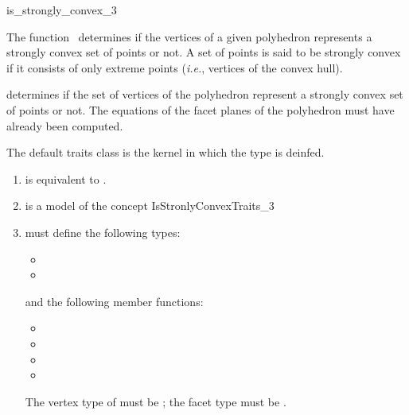 \begin{ccRefFunction}{is_strongly_convex_3}

\ccDefinition

The function \ccRefName\ determines if the vertices of a given polyhedron 
represents a strongly convex set of points or not.  A set of points is said 
to be strongly convex if it consists of only extreme points (\textit{i.e.}, 
vertices of the convex hull).


{
determines if the set of vertices of the polyhedron  represent
a strongly convex set of points or not.
\ccPrecond%
The equations of the facet planes of the polyhedron must have
already been computed.
}

The default traits class is the kernel in which the type 
 is deinfed.

\begin{enumerate}
   \item {} is equivalent to .
   \item {} is a model of the concept IsStronlyConvexTraits\_3
  \item {} must define the following types:
        \begin{itemize}
          \item {}
          \item {}
        \end{itemize}
        and the following member functions:
        \begin{itemize}
          \item {}
          \item {}
          \item {}
          \item {}
        \end{itemize}
        The vertex type of  must be 
        ;
        the facet type must be .
\end{enumerate}



\end{ccRefFunction}
